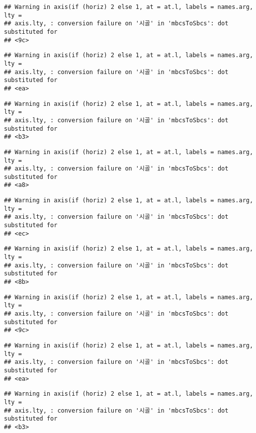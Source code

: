 \documentclass[
]{article}
\begin{document}
\begin{verbatim}
## Warning in axis(if (horiz) 2 else 1, at = at.l, labels = names.arg, lty =
## axis.lty, : conversion failure on '시골' in 'mbcsToSbcs': dot substituted for
## <9c>
\end{verbatim}

\begin{verbatim}
## Warning in axis(if (horiz) 2 else 1, at = at.l, labels = names.arg, lty =
## axis.lty, : conversion failure on '시골' in 'mbcsToSbcs': dot substituted for
## <ea>
\end{verbatim}

\begin{verbatim}
## Warning in axis(if (horiz) 2 else 1, at = at.l, labels = names.arg, lty =
## axis.lty, : conversion failure on '시골' in 'mbcsToSbcs': dot substituted for
## <b3>
\end{verbatim}

\begin{verbatim}
## Warning in axis(if (horiz) 2 else 1, at = at.l, labels = names.arg, lty =
## axis.lty, : conversion failure on '시골' in 'mbcsToSbcs': dot substituted for
## <a8>
\end{verbatim}

\begin{verbatim}
## Warning in axis(if (horiz) 2 else 1, at = at.l, labels = names.arg, lty =
## axis.lty, : conversion failure on '시골' in 'mbcsToSbcs': dot substituted for
## <ec>
\end{verbatim}

\begin{verbatim}
## Warning in axis(if (horiz) 2 else 1, at = at.l, labels = names.arg, lty =
## axis.lty, : conversion failure on '시골' in 'mbcsToSbcs': dot substituted for
## <8b>
\end{verbatim}

\begin{verbatim}
## Warning in axis(if (horiz) 2 else 1, at = at.l, labels = names.arg, lty =
## axis.lty, : conversion failure on '시골' in 'mbcsToSbcs': dot substituted for
## <9c>
\end{verbatim}

\begin{verbatim}
## Warning in axis(if (horiz) 2 else 1, at = at.l, labels = names.arg, lty =
## axis.lty, : conversion failure on '시골' in 'mbcsToSbcs': dot substituted for
## <ea>
\end{verbatim}

\begin{verbatim}
## Warning in axis(if (horiz) 2 else 1, at = at.l, labels = names.arg, lty =
## axis.lty, : conversion failure on '시골' in 'mbcsToSbcs': dot substituted for
## <b3>
\end{verbatim}
\end{document}
